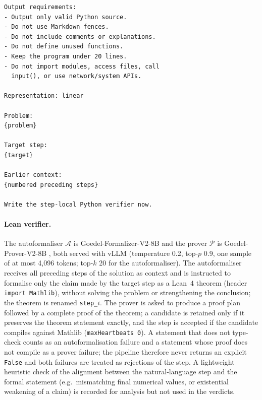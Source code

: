 \begin{small}
\begin{verbatim}
Output requirements:
- Output only valid Python source.
- Do not use Markdown fences.
- Do not include comments or explanations.
- Do not define unused functions.
- Keep the program under 20 lines.
- Do not import modules, access files, call
  input(), or use network/system APIs.

Representation: linear

Problem:
{problem}

Target step:
{target}

Earlier context:
{numbered preceding steps}

Write the step-local Python verifier now.
\end{verbatim}
\end{small}

\paragraph{Lean verifier.} The autoformaliser $\mathcal{A}$ is Goedel-Formalizer-V2-8B and the prover $\mathcal{P}$ is Goedel-Prover-V2-8B \cite{goedel2025}, both served with vLLM (temperature 0.2, top-$p$ 0.9, one sample of at most 4,096 tokens; top-$k$ 20 for the autoformaliser). The autoformaliser receives all preceding steps of the solution as context and is instructed to formalise only the claim made by the target step as a Lean~4 theorem (header \texttt{import Mathlib}), without solving the problem or strengthening the conclusion; the theorem is renamed \texttt{step\_$i$}. The prover is asked to produce a proof plan followed by a complete proof of the theorem; a candidate is retained only if it preserves the theorem statement exactly, and the step is accepted if the candidate compiles against Mathlib (\texttt{maxHeartbeats 0}). A statement that does not type-check counts as an autoformalisation failure and a statement whose proof does not compile as a prover failure; the pipeline therefore never returns an explicit \texttt{False} and both failures are treated as rejections of the step. A lightweight heuristic check of the alignment between the natural-language step and the formal statement (e.g.\ mismatching final numerical values, or existential weakening of a claim) is recorded for analysis but not used in the verdicts.

